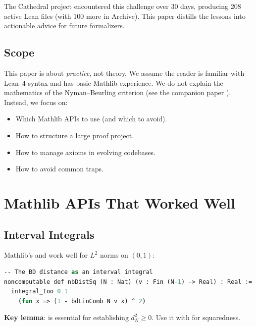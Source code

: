 \documentclass[11pt,a4paper]{article}
\begin{document}
The Cathedral project encountered this challenge over 30 days,
producing 208 active Lean files (with 100 more in Archive).
This paper distills the lessons into actionable advice for future formalizers.

\subsection{Scope}

This paper is about \emph{practice}, not theory. We assume the reader
is familiar with Lean~4 syntax and has basic Mathlib experience. We
do not explain the mathematics of the Nyman--Beurling criterion
(see the companion paper \cite{cathedral-math}). Instead, we focus on:

\begin{itemize}
  \item Which Mathlib APIs to use (and which to avoid).
  \item How to structure a large proof project.
  \item How to manage axioms in evolving codebases.
  \item How to avoid common traps.
\end{itemize}

\section{Mathlib APIs That Worked Well}
\label{sec:good-apis}

\subsection{Interval Integrals}

Mathlib's  and
 work well for $L^2$ norms on $(0,1)$:

\begin{lstlisting}[language=ML,caption={L2 norm on (0,1)}]
-- The BD distance as an interval integral
noncomputable def nbDistSq (N : Nat) (v : Fin (N-1) -> Real) : Real :=
  integral_Ioo 0 1
    (fun x => (1 - bdLinComb N v x) ^ 2)
\end{lstlisting}

\textbf{Key lemma}:  is
essential for establishing $d_N^2 \geq 0$. Use it with
 for squaredness.
\end{document}
